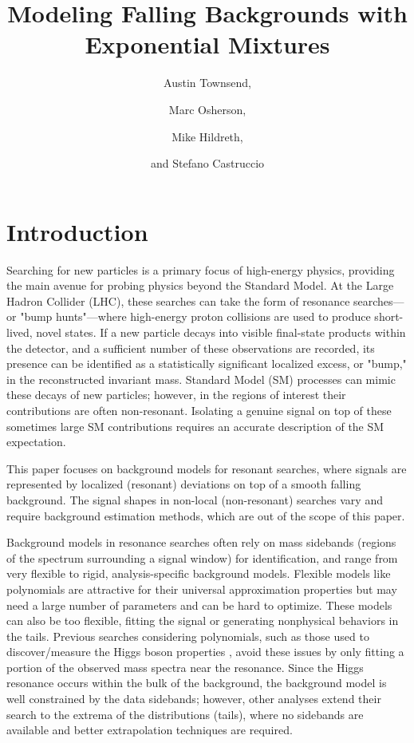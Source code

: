 \documentclass[a4paper,11pt]{article}
\title{Modeling Falling Backgrounds with Exponential Mixtures}
\author{Austin Townsend,}
\author{Marc Osherson,}
\author{Mike Hildreth, }
\author{and Stefano Castruccio}
\affiliation{University of Notre Dame, USA}
\begin{document}
\maketitle
\flushbottom

\section{Introduction}
\label{sec:intro}

Searching for new particles is a primary focus of high-energy physics, providing the main avenue for probing physics beyond the Standard Model. At the Large Hadron Collider (LHC), these searches can take the form of resonance searches—or "bump hunts"—where high-energy proton collisions are used to produce short-lived, novel states. If a new particle decays into visible final-state products within the detector, and a sufficient number of these observations are recorded, its presence can be identified as a statistically significant localized excess, or "bump," in the reconstructed invariant mass. Standard Model (SM) processes can mimic these decays of new particles; however, in the regions of interest their contributions are often non-resonant. Isolating a genuine signal on top of these sometimes large SM contributions requires an accurate description of the SM expectation.

This paper focuses on background models for resonant searches, where signals are 
represented by localized (resonant) deviations on top of a smooth falling background. The signal 
shapes in non-local (non-resonant) searches vary and require background estimation methods, which 
are out of the scope of this paper.

Background models in resonance searches often rely on mass sidebands (regions 
of the spectrum surrounding a signal window) for identification, and range from 
very flexible to rigid, analysis-specific background models. Flexible models like polynomials are attractive for their universal approximation properties but may need a large number of parameters and can 
be hard to optimize. These models can also be too flexible, fitting the signal or generating nonphysical behaviors in the tails. Previous searches considering polynomials, 
such as those used to discover/measure the Higgs boson properties \cite{CMS_Higgs_Discovery, Aad_2014}, avoid these issues by only fitting a portion of the observed mass spectra near the resonance. Since the Higgs resonance 
occurs within the bulk of the background, the background model is well constrained by the data 
sidebands; however, other analyses extend their search to the extrema of the distributions (tails), where no sidebands are 
available and better extrapolation techniques are required.
\end{document}
